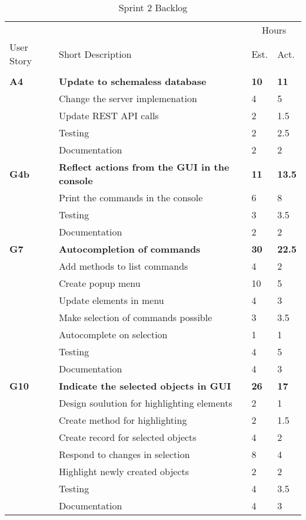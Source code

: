 \begin{table}
\caption{Sprint 2 Backlog}
\centering
\begin{tabular}{ l p{8cm} l l }
\hline 
			&				&\multicolumn{2}{c}{Hours}			\\
 User Story	& Short Description		&Est.		&Act.	                               \\ 
\hline \\ [-2.0ex]
 \bf{A4}     &\bf{Update to schemaless database}		&\bf{10}		&\bf{11}          \\ 
		  &Change the server implemenation		&4			&5		\\
		  &Update REST API calls					&2			&1.5		\\
		  &Testing							&2			&2.5		\\
		  &Documentation						&2			&2		\\

 \bf{G4b}     &\bf{Reflect actions from the GUI in the console} 		&\bf{11}		&\bf{13.5}               \\ 
		  &Print the commands in the console				&6			&8		\\
		  &Testing									&3			&3.5		\\
		  &Documentation								&2			&2		\\

 \bf{G7}     &\bf{Autocompletion of commands} 	&\bf{30}		&\bf{22.5}		     \\ 
		  &Add methods to list commands		&4			&2		\\
		  &Create popup menu				&10			&5		\\
		  &Update elements in menu			&4			&3		\\
		  &Make selection of commands possible&3			&3.5		\\
		  &Autocomplete on selection			&1			&1		\\
		  &Testing						&4			&5		\\
		  &Documentation					&4			&3		\\

 \bf{G10}   &\bf{Indicate the selected objects in GUI}		&\bf{26}		&\bf{17}		     \\ 
		  &Design soulution for highlighting elements	&2			&1		\\
		  &Create method for highlighting				&2			&1.5		\\
		  &Create record for selected objects			&4			&2		\\
		  &Respond to changes in selection				&8			&4		\\
		  &Highlight newly created objects				&2			&2		\\
		  &Testing								&4			&3.5		\\
		  &Documentation							&4			&3		\\


\end{tabular}
\end{table}
